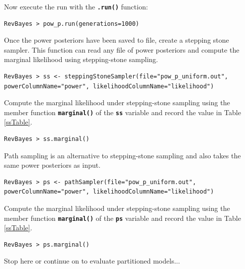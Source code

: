 \documentclass[11pt]{article}
\newcommand{\cl}[1]{{\texttt{\textbf{#1}}}}
\begin{document}
Now execute the run with the \cl{.run()} function:
{\tt \begin{snugshade*}
\begin{lstlisting}
RevBayes > pow_p.run(generations=1000)  
\end{lstlisting}
\end{snugshade*}}

Once the power posteriors have been saved to file, create a stepping stone sampler. This function can read any file of power posteriors and compute the marginal likelihood using stepping-stone sampling. 
{\tt \small \begin{snugshade*}
\begin{lstlisting}
RevBayes > ss <- steppingStoneSampler(file="pow_p_uniform.out", powerColumnName="power", likelihoodColumnName="likelihood")
\end{lstlisting}
\end{snugshade*}}

Compute the marginal likelihood under stepping-stone sampling using the member function \cl{marginal()} of the \cl{ss} variable and record the value in Table \ref{ssTable}.
{\tt \begin{snugshade*}
\begin{lstlisting}
RevBayes > ss.marginal() 
\end{lstlisting}
\end{snugshade*}}

Path sampling is an alternative to stepping-stone sampling and also takes the same power posteriors as input. 
{\tt \small \begin{snugshade*}
\begin{lstlisting}
RevBayes > ps <- pathSampler(file="pow_p_uniform.out", powerColumnName="power", likelihoodColumnName="likelihood")
\end{lstlisting}
\end{snugshade*}}

Compute the marginal likelihood under stepping-stone sampling using the member function \cl{marginal()} of the \cl{ps} variable and record the value in Table \ref{ssTable}.
{\tt \begin{snugshade*}
\begin{lstlisting}
RevBayes > ps.marginal() 
\end{lstlisting}
\end{snugshade*}}



\vspace{5mm}

{\begin{framed}
\begin{center}
Stop here or continue on to evaluate partitioned models...
\end{center}
\end{framed}}
\end{document}

